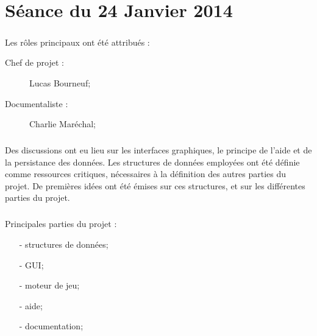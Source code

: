 
\newcommand{\titre}{Compte-rendu de séance}
\newcommand{\titrehead}{Compte-rendu de séance}













\chapter*{Séance du 24 Janvier 2014}
    	\paragraph*{}
	Les rôles principaux ont été attribués :
	\begin{description}
		\item[Chef de projet : ] Lucas Bourneuf;
		\item[Documentaliste : ] Charlie Maréchal;
	\end{description}
    	\paragraph*{}
	Des discussions ont eu lieu sur les interfaces graphiques, le principe de l'aide et de la persistance des données.
	Les structures de données employées ont été définie comme ressources critiques, nécessaires à la définition des autres parties du projet. 
	De premières idées ont été émises sur ces structures, et sur les différentes parties du projet.
    	\paragraph*{}
	Principales parties du projet :
	\begin{itemize}
		\item[- structures de données;]
		\item[- GUI;]
		\item[- moteur de jeu;]
		\item[- aide;]
		\item[- documentation;]
	\end{itemize}

